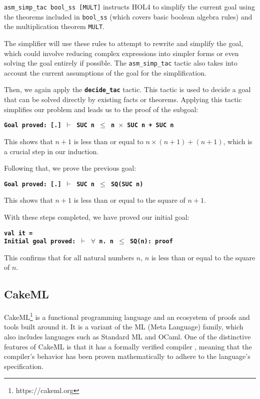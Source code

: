 \texttt{asm\_simp\_tac bool\_ss [MULT]} instructs HOL4 to simplify the current goal using the theorems included in \texttt{bool\_ss} (which covers basic boolean algebra rules) and the multiplication theorem \texttt{MULT}. 

The simplifier will use these rules to attempt to rewrite and simplify the goal, which could involve reducing complex expressions into simpler forms or even solving the goal entirely if possible. The \texttt{asm\_simp\_tac} tactic also takes into account the current assumptions of the goal for the simplification.

Then, we again apply the \textbf{\texttt{decide\_tac}} tactic. This tactic is used to decide a goal that can be solved directly by existing facts or theorems. Applying this tactic simplifies our problem and leads us to the proof of the subgoal:

\begin{flushleft}
\textbf{\texttt{Goal proved: [.] $\vdash$ SUC n $\leq$ n $\times$ SUC n + SUC n}}
\end{flushleft}

This shows that $n+1$ is less than or equal to $n \times (n+1) + (n+1)$, which is a crucial step in our induction.

Following that, we prove the previous goal:

\begin{flushleft}
\textbf{\texttt{Goal proved: [.] $\vdash$ SUC n $\leq$ SQ(SUC n)}}
\end{flushleft}

This shows that $n+1$ is less than or equal to the square of $n+1$.

With these steps completed, we have proved our initial goal:

\begin{flushleft}
\textbf{\texttt{val it =}}\\
\textbf{\texttt{Initial goal proved: $\vdash$ $\forall$ n. n $\leq$ SQ(n): proof}}
\end{flushleft}

This confirms that for all natural numbers $n$, $n$ is less than or equal to the square of $n$.

\subsection{CakeML}
CakeML\footnote{https://cakeml.org} is a functional programming language and an ecosystem of proofs and tools built around it. It is a variant of the ML (Meta Language) family, which also includes languages such as Standard ML and OCaml. One of the distinctive features of CakeML is that it has a formally verified compiler \cite{Tan2019TheVC}, meaning that the compiler's behavior has been proven mathematically to adhere to the language's specification.

